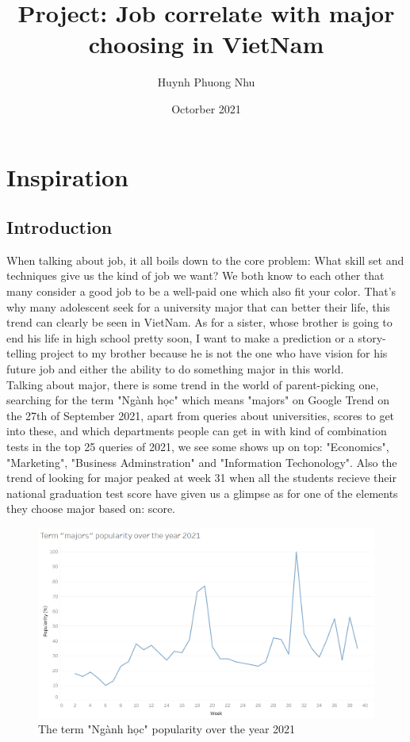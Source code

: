\documentclass{article}
\title{Project: Job correlate with major choosing in VietNam}
\author{Huynh Phuong Nhu}
\date{Octorber 2021}
\begin{document}
\maketitle

\section{Inspiration}
\subsection{Introduction}
When talking about job, it all boils down to the core problem: What skill set and techniques give us the kind of job we want? We both know to each other that many consider a good job to be a well-paid one which also fit your color. That's why many adolescent seek for a university major that can better their life, this trend can clearly be seen in VietNam. As for a sister, whose brother is going to end his life in high school pretty soon, I want to make a prediction or a story-telling project to my brother because he is not the one who have vision for his future job and either the ability to do something major in this world. \\
Talking about major, there is some trend in the world of parent-picking one, searching for the term "Ngành học" which means "majors" on Google Trend on the 27th of September 2021, apart from queries about universities, scores to get into these, and which departments people can get in with kind of combination tests in the top 25 queries of 2021, we see some shows up on top: "Economics", "Marketing", "Business Adminstration" and "Information Techonology". Also the trend of looking for major peaked at week 31 when all the students recieve their national graduation test score have given us a glimpse as for one of the elements they choose major based on: score.\\

\begin{figure}[H]
	\begin{center}
		\includegraphics[scale=0.6]{Term-Popularity.png}
	\end{center}
	\caption{The term "Ngành học" popularity over the year 2021}
\end{figure}
\end{document}
